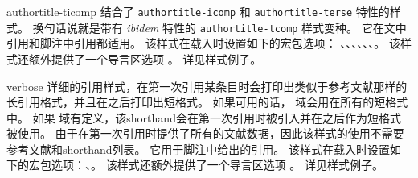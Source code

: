 \begin{marglist}
\item[authortitle-ticomp]
结合了 \texttt{authortitle-icomp} 和 \texttt{authortitle-terse} 特性的样式。
换句话说就是带有 \emph{ibidem} 特性的 \texttt{authortitle-tcomp} 样式变种。
它在文中引用和脚注中引用都适用。
该样式在载入时设置如下的宏包选项：
、、、、、、。
该样式还额外提供了一个导言区选项 。
详见样式例子。

\item[verbose]
详细的引用样式，在第一次引用某条目时会打印出类似于参考文献那样的长引用格式，并且在之后打印出短格式。
如果可用的话， 域会用在所有的短格式中。
如果  域有定义，该shorthand会在第一次引用时被引入并在之后作为短格式被使用。
由于在第一次引用时提供了所有的文献数据，因此该样式的使用不需要参考文献和shorthand列表。
它用于脚注中给出的引用。
该样式在载入时设置如下的宏包选项：、。
该样式还额外提供了一个导言区选项 。
详见样式例子。


\end{marglist}
